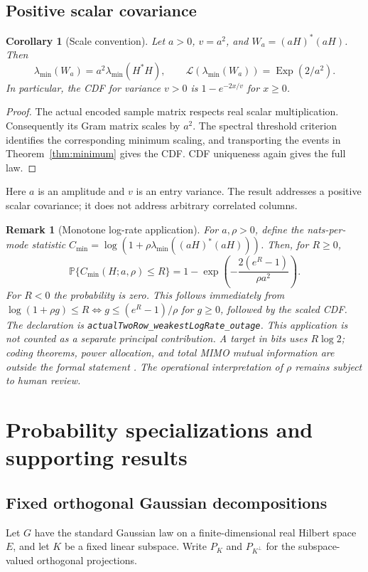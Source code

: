 \documentclass[11pt]{article}
\newtheorem{corollary}[theorem]{Corollary}
\newtheorem{remark}[theorem]{Remark}
\newcommand{\Prob}{\mathbb P}
\newcommand{\Law}{\mathcal L}
\newcommand{\lean}[1]{{\small\nolinkurl{#1}}}
\begin{document}
\subsection{Positive scalar covariance}
\begin{corollary}[Scale convention]\label{thm:scale}
Let $a>0$, $v=a^2$, and $W_a=(aH)^*(aH)$. Then
\[
 \lambda_{\min}(W_a)=a^2\lambda_{\min}(H^*H),\qquad
 \Law(\lambda_{\min}(W_a))=\operatorname{Exp}(2/a^2).
\]
In particular, the CDF for variance $v>0$ is $1-e^{-2x/v}$ for $x\geq0$.
\end{corollary}
\begin{proof}
The actual encoded sample matrix respects real scalar multiplication.
Consequently its Gram matrix scales by $a^2$. The spectral threshold criterion
identifies the corresponding minimum scaling, and transporting the events in
Theorem~\ref{thm:minimum} gives the CDF. CDF uniqueness again gives the full law.
\end{proof}
Here $a$ is an amplitude and $v$ is an entry variance. The result addresses a
positive scalar covariance; it does not address arbitrary correlated columns.

\begin{remark}[Monotone log-rate application]\label{rem:outage}
For $a,\rho>0$, define the nats-per-mode statistic
$C_{\min}=\log(1+\rho\lambda_{\min}((aH)^*(aH)))$. Then, for $R\geq0$,
\begin{equation}\label{eq:outage}
 \Prob\{C_{\min}(H;a,\rho)\leq R\}
 =1-\exp\left(-\frac{2(e^R-1)}{\rho a^2}\right).
\end{equation}
For $R<0$ the probability is zero. This follows immediately from
$\log(1+\rho g)\leq R\iff g\leq(e^R-1)/\rho$ for $g\geq0$, followed by the
scaled CDF. The declaration is \lean{actualTwoRow_weakestLogRate_outage}.
This application is not counted as a separate principal contribution.
A target in bits uses $R\log2$; coding theorems, power allocation, and total
MIMO mutual information are outside the formal statement \cite{tse}.
The operational interpretation of $\rho$ remains subject to human review.
\end{remark}

\section{Probability specializations and supporting results}
\subsection{Fixed orthogonal Gaussian decompositions}
Let $G$ have the standard Gaussian law on a finite-dimensional real Hilbert
space $E$, and let $K$ be a fixed linear subspace. Write $P_K$ and $P_{K^\perp}$
for the subspace-valued orthogonal projections.
\end{document}
